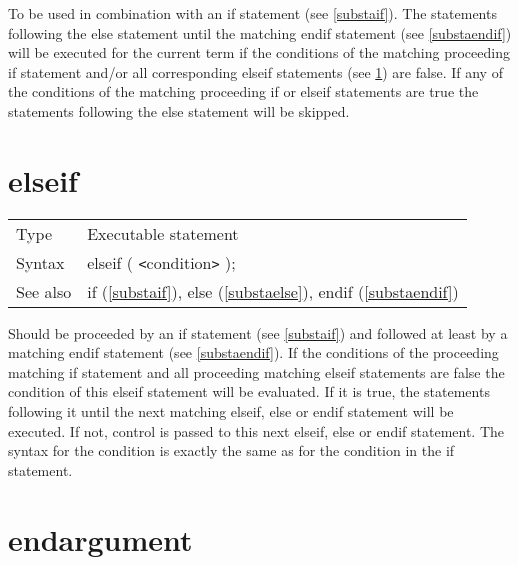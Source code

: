 \noindent To be used in combination with an if statement (see 
\ref{substaif}). The statements following the
else statement until the matching 
endif 
statement (see \ref{substaendif}) will be executed for the current term if 
the conditions of the matching proceeding if 
statement and/or all corresponding elseif statements (see 
\ref{substaelseif}) are false. If any of the conditions of the matching 
proceeding if or elseif statements are true the statements following the 
else statement will be skipped. \vspace{10mm}

 
\section{elseif}
\label{substaelseif}

\noindent \begin{tabular}{ll}
Type & Executable statement\\
Syntax & elseif ( {\tt<}condition{\tt>} );
\\ See also & if (\ref{substaif}),
              else (\ref{substaelse}),
              endif (\ref{substaendif})
\end{tabular} \vspace{4mm}

\noindent Should be proceeded by an if 
statement (see \ref{substaif}) and followed at least by a matching 
endif 
statement (see \ref{substaendif}). If the conditions of the proceeding 
matching if statement and all proceeding matching
elseif statements are false the 
condition of this elseif statement will be evaluated. If it is true, the 
statements following it until the next matching elseif,
else or endif statement will be executed. 
If not, control is passed to this next elseif, else or endif statement. The 
syntax for the condition is exactly the same as for the condition in the if 
statement. \vspace{10mm}
 

\section{endargument}
\label{substaendargument}

